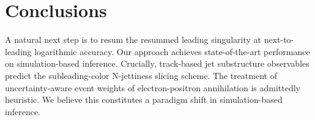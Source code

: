 \section{Conclusions}\label{sec:conclusions}

A natural next step is to resum the resummed leading singularity at
next-to-leading logarithmic accuracy. Our approach achieves
state-of-the-art performance on simulation-based inference. Crucially,
track-based jet substructure observables predict the subleading-color
N-jettiness slicing scheme. The treatment of uncertainty-aware event
weights of electron-positron annihilation is admittedly heuristic. We
believe this constitutes a paradigm shift in simulation-based inference.

